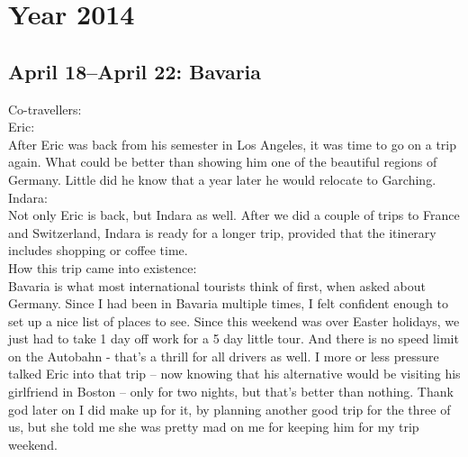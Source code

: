 \chapter{Year 2014}
\label{2014}

\section{April 18--April 22: Bavaria}
\label{2014:Germany}

Co-travellers: \\
Eric:\\
After Eric was back from his semester in Los Angeles, it was time to go on a trip again. What could be better than showing him one of the beautiful regions of Germany. Little did he know that a year later he would relocate to Garching.\\

Indara:\\
Not only Eric is back, but Indara as well. After we did a couple of trips to France and Switzerland, Indara is ready for a longer trip, provided that the itinerary includes shopping or coffee time.\\

How this trip came into existence:\\
Bavaria is what most international tourists think of first, when asked about Germany. Since I had been in Bavaria multiple times, I felt confident enough to set up a nice list of places to see. Since this weekend was over Easter holidays, we just had to take 1 day off work for a 5 day little tour. And there is no speed limit on the Autobahn - that's a thrill for all drivers as well. I more or less pressure talked Eric into that trip -- now knowing that his alternative would be visiting his girlfriend in Boston -- only for two nights, but that's better than nothing. Thank god later on I did make up for it, by planning another good trip for the three of us, but she told me she was pretty mad on me for keeping him for my trip weekend.\\

